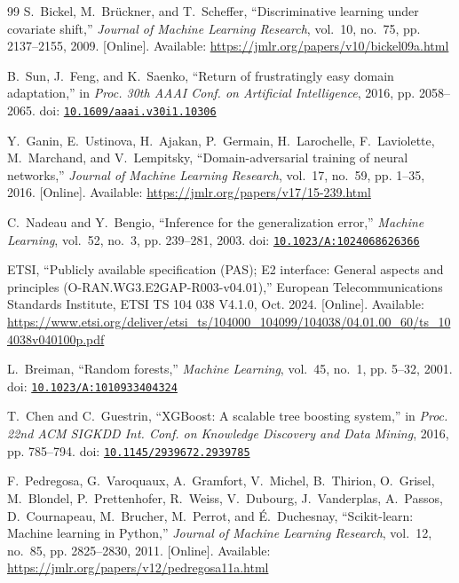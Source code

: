 \begin{thebibliography}{99}
\BIBentryALTinterwordspacing
S.~Bickel, M.~Br{\"u}ckner, and T.~Scheffer, ``Discriminative learning under
  covariate shift,'' \emph{Journal of Machine Learning Research}, vol.~10,
  no.~75, pp. 2137--2155, 2009. [Online]. Available:
  \url{https://jmlr.org/papers/v10/bickel09a.html}
\BIBentrySTDinterwordspacing

B.~Sun, J.~Feng, and K.~Saenko, ``Return of frustratingly easy domain
  adaptation,'' in \emph{Proc. 30th AAAI Conf. on Artificial Intelligence},
  2016, pp. 2058--2065. doi:
  \href{https://doi.org/10.1609/aaai.v30i1.10306}{\nolinkurl{10.1609/aaai.v30i1.10306}}

\BIBentryALTinterwordspacing
Y.~Ganin, E.~Ustinova, H.~Ajakan, P.~Germain, H.~Larochelle, F.~Laviolette,
  M.~Marchand, and V.~Lempitsky, ``Domain-adversarial training of neural
  networks,'' \emph{Journal of Machine Learning Research}, vol.~17, no.~59, pp.
  1--35, 2016. [Online]. Available:
  \url{https://jmlr.org/papers/v17/15-239.html}
\BIBentrySTDinterwordspacing

C.~Nadeau and Y.~Bengio, ``Inference for the generalization error,''
  \emph{Machine Learning}, vol.~52, no.~3, pp. 239--281, 2003. doi:
  \href{https://doi.org/10.1023/A:1024068626366}{\nolinkurl{10.1023/A:1024068626366}}

\BIBentryALTinterwordspacing
{ETSI}, ``Publicly available specification ({PAS}); {E2} interface: General
  aspects and principles ({O-RAN.WG3.E2GAP-R003-v04.01}),'' European
  Telecommunications Standards Institute, ETSI TS 104 038 V4.1.0, Oct. 2024.
  [Online]. Available:
  \url{https://www.etsi.org/deliver/etsi_ts/104000_104099/104038/04.01.00_60/ts_104038v040100p.pdf}
\BIBentrySTDinterwordspacing

L.~Breiman, ``Random forests,'' \emph{Machine Learning}, vol.~45, no.~1, pp.
  5--32, 2001. doi:
  \href{https://doi.org/10.1023/A:1010933404324}{\nolinkurl{10.1023/A:1010933404324}}

T.~Chen and C.~Guestrin, ``{XGBoost}: A scalable tree boosting system,'' in
  \emph{Proc. 22nd ACM SIGKDD Int. Conf. on Knowledge Discovery and Data
  Mining}, 2016, pp. 785--794. doi:
  \href{https://doi.org/10.1145/2939672.2939785}{\nolinkurl{10.1145/2939672.2939785}}

\BIBentryALTinterwordspacing
F.~Pedregosa, G.~Varoquaux, A.~Gramfort, V.~Michel, B.~Thirion, O.~Grisel,
  M.~Blondel, P.~Prettenhofer, R.~Weiss, V.~Dubourg, J.~Vanderplas, A.~Passos,
  D.~Cournapeau, M.~Brucher, M.~Perrot, and {\'E}.~Duchesnay, ``Scikit-learn:
  Machine learning in {Python},'' \emph{Journal of Machine Learning Research},
  vol.~12, no.~85, pp. 2825--2830, 2011. [Online]. Available:
  \url{https://jmlr.org/papers/v12/pedregosa11a.html}
\BIBentrySTDinterwordspacing


\end{thebibliography}
